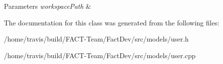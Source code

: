 \begin{DoxyParams}{Parameters}
{\em workspace\-Path} & \\
\hline
\end{DoxyParams}


The documentation for this class was generated from the following files\-:\begin{DoxyCompactItemize}
\item 
/home/travis/build/\-F\-A\-C\-T-\/\-Team/\-Fact\-Dev/src/models/user.\-h\item 
/home/travis/build/\-F\-A\-C\-T-\/\-Team/\-Fact\-Dev/src/models/user.\-cpp\end{DoxyCompactItemize}
